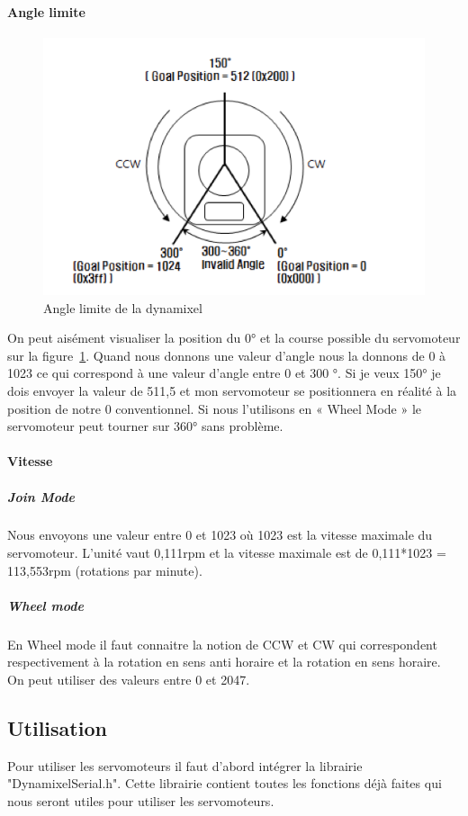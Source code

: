 \paragraph{Angle limite}

\begin{figure}[!ht]
    \centering
    \includegraphics[scale=0.4]{angle.png} 
    \caption{Angle limite de la dynamixel}
    \label{img:angle_AX12}
\end{figure}

On peut aisément visualiser la position du 0° et la course possible du servomoteur sur la figure~\ref{img:angle_AX12}. Quand nous donnons une valeur d’angle nous la donnons de 0 à 1023 ce qui correspond à une valeur d’angle entre 0 et 300 °. Si je veux 150° je dois envoyer la valeur de 511,5 et mon servomoteur se positionnera en réalité à la position de notre 0 conventionnel. Si nous l’utilisons en « Wheel Mode » le servomoteur peut tourner sur 360° sans problème. 

\paragraph{Vitesse}
\subparagraph{Join Mode}
Nous envoyons une valeur entre 0 et 1023 où 1023 est la vitesse maximale du servomoteur. L’unité vaut 0,111rpm et la vitesse maximale est de 0,111*1023 = 113,553rpm (rotations par minute).
\subparagraph{Wheel mode}
En Wheel mode il faut connaitre la notion de CCW et CW qui correspondent respectivement à la rotation en sens anti horaire et la rotation en sens horaire. On peut utiliser des valeurs entre 0 et 2047. 

\subsection{Utilisation}
Pour utiliser les servomoteurs il faut d’abord intégrer la librairie "DynamixelSerial.h". Cette librairie contient toutes les fonctions déjà faites qui nous seront utiles pour utiliser
les servomoteurs. 

